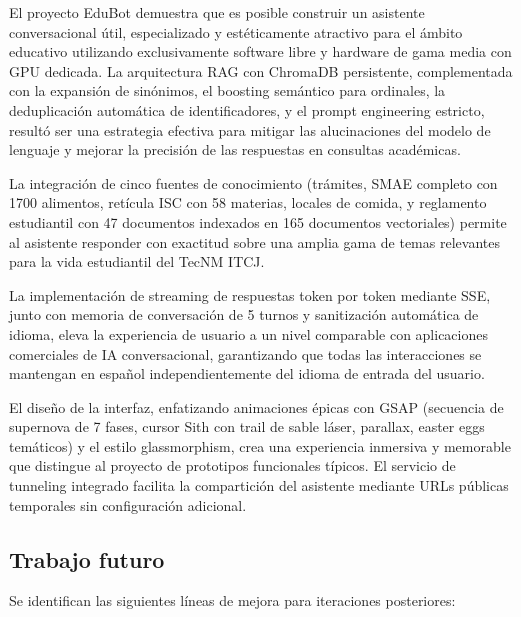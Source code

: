 El proyecto EduBot demuestra que es posible construir un asistente conversacional útil, especializado y estéticamente atractivo para el ámbito educativo utilizando exclusivamente software libre y hardware de gama media con GPU dedicada. La arquitectura RAG con ChromaDB persistente, complementada con la expansión de sinónimos, el boosting semántico para ordinales, la deduplicación automática de identificadores, y el prompt engineering estricto, resultó ser una estrategia efectiva para mitigar las alucinaciones del modelo de lenguaje y mejorar la precisión de las respuestas en consultas académicas.

La integración de cinco fuentes de conocimiento (trámites, SMAE completo con 1700 alimentos, retícula ISC con 58 materias, locales de comida, y reglamento estudiantil con 47 documentos indexados en 165 documentos vectoriales) permite al asistente responder con exactitud sobre una amplia gama de temas relevantes para la vida estudiantil del TecNM ITCJ.

La implementación de streaming de respuestas token por token mediante SSE, junto con memoria de conversación de 5 turnos y sanitización automática de idioma, eleva la experiencia de usuario a un nivel comparable con aplicaciones comerciales de IA conversacional, garantizando que todas las interacciones se mantengan en español independientemente del idioma de entrada del usuario.

El diseño de la interfaz, enfatizando animaciones épicas con GSAP (secuencia de supernova de 7 fases, cursor Sith con trail de sable láser, parallax, easter eggs temáticos) y el estilo glassmorphism, crea una experiencia inmersiva y memorable que distingue al proyecto de prototipos funcionales típicos. El servicio de tunneling integrado facilita la compartición del asistente mediante URLs públicas temporales sin configuración adicional.

\subsection{Trabajo futuro}

Se identifican las siguientes líneas de mejora para iteraciones posteriores:

